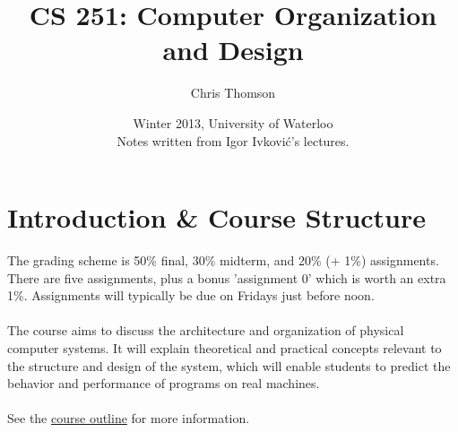 \documentclass[]{article}
\begin{document}
	\title{\bf{CS 251: Computer Organization and Design}}
	\date{Winter 2013, University of Waterloo \\ \center Notes written from Igor Ivkovi\'c's lectures.}
	\author{Chris Thomson}
	\maketitle
	\newpage

	\section{Introduction \& Course Structure}
		The grading scheme is 50\% final, 30\% midterm, and 20\% (+ 1\%) assignments. There are five assignments, plus a bonus 'assignment 0' which is worth an extra 1\%. Assignments will typically be due on Fridays just before noon. 
		\\ \\
		The course aims to discuss the architecture and organization of physical computer systems. It will explain theoretical and practical concepts relevant to the structure and design of the system, which will enable students to predict the behavior and performance of programs on real machines.
		\\ \\
		See the \href{https://www.student.cs.uwaterloo.ca/~cs251/W13/outline.html}{course outline} for more information.
\end{document}
